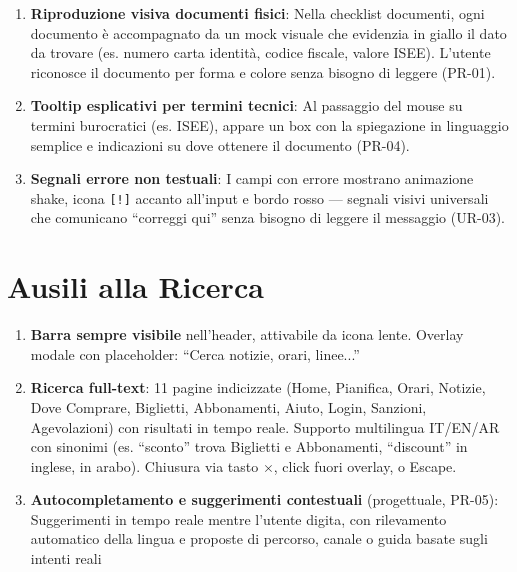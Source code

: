 ﻿\documentclass[11pt,a4paper]{article}
\begin{document}
\begin{tcolorbox}[rffield]
\begin{enumerate}[nosep,leftmargin=*]
  \item \textbf{Riproduzione visiva documenti fisici}: Nella checklist documenti, ogni documento \`e accompagnato da un mock visuale che evidenzia in giallo il dato da trovare (es. numero carta identit\`a, codice fiscale, valore ISEE). L'utente riconosce il documento per forma e colore senza bisogno di leggere (PR-01).
  \item \textbf{Tooltip esplicativi per termini tecnici}: Al passaggio del mouse su termini burocratici (es. ISEE), appare un box con la spiegazione in linguaggio semplice e indicazioni su dove ottenere il documento (PR-04).
  \item \textbf{Segnali errore non testuali}: I campi con errore mostrano animazione shake, icona \texttt{[!]} accanto all'input e bordo rosso --- segnali visivi universali che comunicano ``correggi qui'' senza bisogno di leggere il messaggio (UR-03).
\end{enumerate}
\end{tcolorbox}

\section{Ausili alla Ricerca}

\begin{tcolorbox}[rffield]
\small
\begin{enumerate}[nosep,leftmargin=*]
  \item \textbf{Barra sempre visibile} nell'header, attivabile da icona lente. Overlay modale con placeholder: ``Cerca notizie, orari, linee...''
  \item \textbf{Ricerca full-text}: 11 pagine indicizzate (Home, Pianifica, Orari, Notizie, Dove Comprare, Biglietti, Abbonamenti, Aiuto, Login, Sanzioni, Agevolazioni) con risultati in tempo reale. Supporto multilingua IT/EN/AR con sinonimi (es. ``sconto'' trova Biglietti e Abbonamenti, ``discount'' in inglese, in arabo). Chiusura via tasto $\times$, click fuori overlay, o Escape.

  \item \textbf{Autocompletamento e suggerimenti contestuali} (progettuale, PR-05): Suggerimenti in tempo reale mentre l'utente digita, con rilevamento automatico della lingua e proposte di percorso, canale o guida basate sugli intenti reali

\end{enumerate}
\end{tcolorbox}
\end{document}
